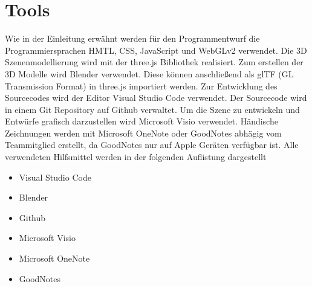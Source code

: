 \section{Tools}
Wie in der Einleitung erwähnt werden für den Programmentwurf die
Programmiersprachen HMTL, CSS, JavaScript und WebGLv2 verwendet.
Die 3D Szenenmodellierung wird mit der three.js Bibliothek realisiert.
Zum erstellen der 3D Modelle wird Blender verwendet. Diese können anschließend als
glTF (GL Transmission Format) in three.js importiert werden.
\newparagraph
Zur Entwicklung des Sourcecodes wird der Editor Visual Studio Code verwendet.
Der Sourcecode wird in einem Git Repository auf Github verwaltet.
\newparagraph
Um die Szene zu entwickeln und Entwürfe grafisch darzustellen wird Microsoft Visio verwendet.
Händische Zeichnungen werden mit Microsoft OneNote oder GoodNotes abhägig vom Teammitglied erstellt,
da GoodNotes nur auf Apple Geräten verfügbar ist.
\newparagraph
Alle verwendeten Hilfsmittel werden in der folgenden Auflistung dargestellt
\begin{itemize}
\item Visual Studio Code
\item Blender
\item Github
\item Microsoft Visio
\item Microsoft OneNote
\item GoodNotes
\end{itemize}